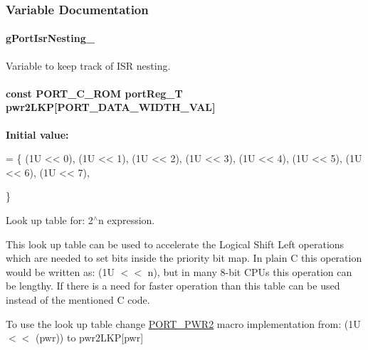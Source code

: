 \subsubsection{Variable Documentation}
\hypertarget{group__template__cpu__impl_ga76dd98d1f19ff5ce4b4e880dfcedadb9}{
\paragraph[{g\-Port\-Isr\-Nesting\-\_\-}]{ g\-Port\-Isr\-Nesting\-\_\-}}\label{group__template__cpu__impl_ga76dd98d1f19ff5ce4b4e880dfcedadb9}


Variable to keep track of I\-S\-R nesting. 

\hypertarget{group__template__cpu__impl_ga7c74d77135d5a694029ce4805f5dbc13}{
\paragraph[{pwr2\-L\-K\-P}]{\setlength{\rightskip}{0pt plus 5cm}const P\-O\-R\-T\-\_\-\-C\-\_\-\-R\-O\-M {\bf port\-Reg\-\_\-\-T} pwr2\-L\-K\-P\mbox{[}{\bf P\-O\-R\-T\-\_\-\-D\-A\-T\-A\-\_\-\-W\-I\-D\-T\-H\-\_\-\-V\-A\-L}\mbox{]}}}\label{group__template__cpu__impl_ga7c74d77135d5a694029ce4805f5dbc13}
{\bfseries Initial value\-:}
\begin{DoxyCode}
= \{
    (1U <<  0), (1U <<  1), (1U <<  2), (1U <<  3),
    (1U <<  4), (1U <<  5), (1U <<  6), (1U <<  7),










\}
\end{DoxyCode}


Look up table for\-: 2$^\wedge$n expression. 

This look up table can be used to accelerate the Logical Shift Left operations which are needed to set bits inside the priority bit map. In plain C this operation would be written as\-: {\ttfamily (1\-U $<$$<$ n)}, but in many 8-\/bit C\-P\-Us this operation can be lengthy. If there is a need for faster operation than this table can be used instead of the mentioned C code.

To use the look up table change \hyperlink{group__template__cpu__intf_ga4b938b55e8398b93969cfb7bc64177cd}{P\-O\-R\-T\-\_\-\-P\-W\-R2} macro implementation from\-: {\ttfamily (1\-U $<$$<$ (pwr))} to {\ttfamily pwr2\-L\-K\-P\mbox{[}pwr\mbox{]}} 